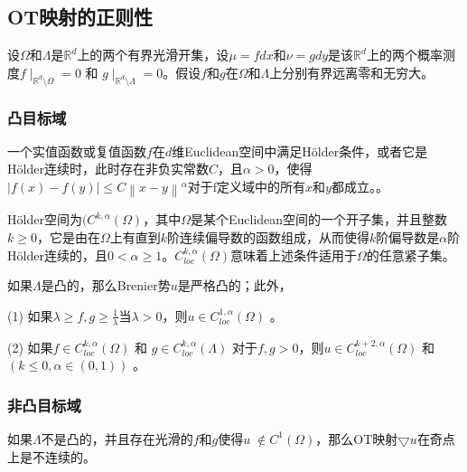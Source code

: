 \subsection{OT映射的正则性}

设$\Omega$和$\Lambda$是$\mathbb{R}^d$上的两个有界光滑开集，设$\mu=fdx$和$\nu=gdy$是该$\mathbb{R}^d$上的两个概率测度$f\mid _{\mathbb{R}^d \setminus \Omega }=0$ 和 $g\mid _{\mathbb{R}^d \setminus \Lambda }=0$。假设$f$和$g$在$\Omega$和$\Lambda$上分别有界远离零和无穷大。

\subsubsection{凸目标域}

\begin{definition}[Hölder连续]\label{definition:3.5}
	一个实值函数或复值函数$f$在$d$维Euclidean空间中满足Hölder条件，或者它是Hölder连续时，此时存在非负实常数$C$，且$\alpha>0$，使得$\left | f(x)-f(y) \right | \le C \left \| x-y \right \|^{\alpha }$对于f定义域中的所有$x$和$y$都成立。。
\end{definition}

\begin{definition}[Hölder空间]	\label{definition:3.6}
	Hölder空间为$(C^{k,\alpha}(\Omega)$，其中$\Omega$是某个Euclidean空间的一个开子集，并且整数$k \ge 0$，它是由在$\Omega$上有直到$k$阶连续偏导数的函数组成，从而使得$k$阶偏导数是$\alpha$阶Hölder连续的，且$0<\alpha \ge 1$。$C_{loc} ^{k,\alpha} (\Omega)$意味着上述条件适用于$\Omega$的任意紧子集。
\end{definition}

\begin{theorem}[Caffarelli【45】]	\label{theorem:3.4}
	如果$\Lambda$是凸的，那么Brenier势$u$是严格凸的；此外，
	
	(1) 如果$\lambda \ge f, g \ge \frac{1}{\lambda}$当$\lambda>0$，则$u \in C_{loc} ^{1,\alpha} (\Omega)$ 。
	
	(2) 如果$f \in C_{loc} ^{k,\alpha} (\Omega)$ 和 $g \in C_{loc} ^{k,\alpha} (\Lambda)$ 对于$f,g>0$，则$u \in C_{loc} ^{k+2,\alpha} (\Omega)$ 和 $(k \le 0, \alpha \in(0,1))$ 。
\end{theorem}

\subsubsection{非凸目标域}

如果$\Lambda$不是凸的，并且存在光滑的$f$和$g$使得$u \notin C^1 (\Omega)$，那么OT映射$\bigtriangledown u$在奇点上是不连续的。


